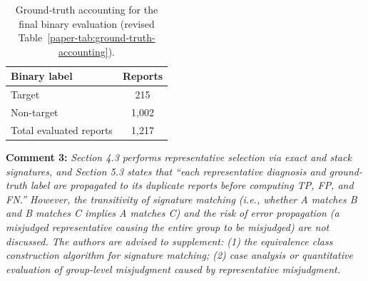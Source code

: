 \documentclass[onecolumn,11pt]{article}
\newcommand{\secc}[2]{\par\mySep \noindent \textsf{\textbf{#1 }}\textit{#2}\par}
\newcommand{\mySep}{\vspace{8pt}}
\begin{document}
\begin{table}[!ht]
\centering
\small
\caption{Ground-truth accounting for the final binary evaluation (revised Table~\ref{paper-tab:ground-truth-accounting}).}
\label{tab:ground-truth-accounting-response}
\begin{tabular*}{\linewidth}{@{\extracolsep{\fill}}>{\color{blue}}l>{\color{blue}}c}
\toprule
Binary label & Reports \\
\midrule
Target & 215 \\
Non-target & 1,002 \\
Total evaluated reports & 1,217 \\
\bottomrule
\end{tabular*}
\end{table}

\secc{Comment 3:}{Section 4.3 performs representative selection via exact and stack signatures, and Section 5.3 states that ``each representative diagnosis and ground-truth label are propagated to its duplicate reports before computing TP, FP, and FN.'' However, the transitivity of signature matching (i.e., whether A matches B and B matches C implies A matches C) and the risk of error propagation (a misjudged representative causing the entire group to be misjudged) are not discussed. The authors are advised to supplement: (1) the equivalence class construction algorithm for signature matching; (2) case analysis or quantitative evaluation of group-level misjudgment caused by representative misjudgment.}
\end{document}
